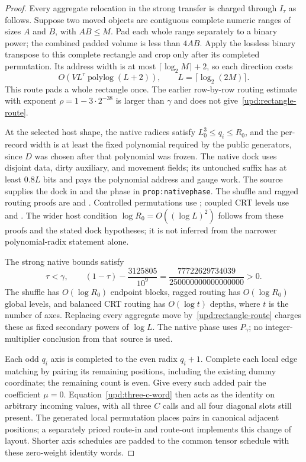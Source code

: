 \begin{proof}
Every aggregate relocation in the strong transfer is charged through
$I_\tau$ as follows.  Suppose two moved objects are contiguous complete
numeric ranges of sizes $A$ and $B$, with $AB\leq M$.  Pad each whole
range separately to a binary power; the combined padded volume is less
than $4AB$.  Apply the lossless binary transpose to this complete rectangle
and crop only after its completed permutation.  Its address width is at
most $\lceil\log_2 M\rceil+2$, so each direction costs
\begin{equation}
\label{upd:rectangle-route}
  O\!\left(VL^\tau\operatorname{polylog}(L+2)\right),
  \qquad L=\lceil\log_2(2M)\rceil.
\end{equation}
This route pads a whole rectangle once.  The earlier row-by-row routing
estimate with exponent $\rho=1-3\cdot2^{-38}$ is larger than $\gamma$ and
does not give~\eqref{upd:rectangle-route}.

At the selected host shape, the native radices satisfy
$L_0^3\leq q_i\leq R_0$, and the per-record width is at least the fixed
polynomial required by the public generators, since $D$ was chosen after
that polynomial was frozen.  The native dock uses disjoint data, dirty
auxiliary, and movement fields; its untouched suffix has at least $0.8L$
bits and pays the polynomial address and gauge work.  The source supplies
the dock in  and the phase in
\texttt{prop:nativephase}.  The shuffle and ragged routing proofs are
 and .
Controlled permutations use ; coupled CRT
levels use  and .
The wider host condition
$\log R_0=O((\log L)^2)$ follows from these proofs and the stated dock
hypotheses; it is not inferred from the narrower polynomial-radix
statement alone.

The strong native bounds satisfy
\[
  \tau<\gamma,\qquad
  \left(1-\tau\right)-\frac{3125805}{10^9}
   =\frac{77722629734039}{250000000000000000}>0.
\]
The shuffle has $O(\log R_0)$ endpoint blocks, ragged routing has
$O(\log R_0)$ global levels, and balanced CRT routing has $O(\log t)$
depths, where $t$ is the number of axes.  Replacing every aggregate move
by~\eqref{upd:rectangle-route} charges these as fixed secondary powers of
$\log L$.  The native phase uses $P_\gamma$; no integer-multiplier
conclusion from that source is used.

Each odd $q_i$ axis is completed to the even radix $q_i+1$.  Complete
each local edge matching by pairing its remaining positions, including
the existing dummy coordinate; the remaining count is even.  Give every
such added pair the coefficient $\mu=0$.  Equation~\eqref{upd:three-c-word}
then acts as the identity on arbitrary incoming values, with all three
$C$ calls and all four diagonal slots still present.  The generated local
permutation places pairs in canonical adjacent positions; a separately
priced route-in and route-out implements this change of layout.
Shorter axis schedules are padded to the common tensor schedule with
these zero-weight identity words.


\end{proof}
